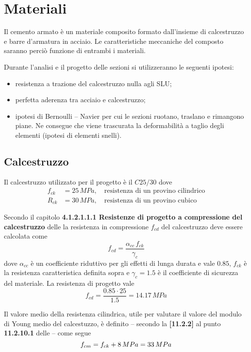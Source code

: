 \chapter{Materiali}\label{chap:materiali}
Il cemento armato \`e un materiale composito formato dall'insieme di calcestruzzo e barre d'armatura in acciaio. Le caratteristiche meccaniche del composto saranno perci\`o funzione di entrambi i materiali.

Durante l'analisi e il progetto delle sezioni si utilizzeranno le seguenti ipotesi:
\begin{itemize}
    \item resistenza a trazione del calcestruzzo nulla agli SLU;
    \item perfetta aderenza tra acciaio e calcestruzzo;
    \item ipotesi di Bernoulli -- Navier per cui le sezioni ruotano, traslano e rimangono piane. Ne consegue che viene trascurata la deformabilit\`a a taglio degli elementi (ipotesi di elementi snelli).
\end{itemize}


\section{Calcestruzzo}
Il calcestruzzo utilizzato per il progetto \`e il $C25/30$ dove 
\begin{align}
	f_{ck} &= 25\,MPa, \label{eq:fck}\quad \text{resistenza di un provino cilindrico}\\
	R_{ck} &= 30\,MPa, \quad \text{resistenza di un provino cubico}
\end{align}

Secondo il capitolo \textbf{4.1.2.1.1.1 Resistenze di progetto a compressione del calcestruzzo} delle \ntc la resistenza in compressione $f_{cd}$ del calcestruzzo deve essere calcolata come
\[ 
f_{cd} = \dfrac{\alpha_{cc}\,f_{ck}}{\gamma_c}
\]
dove $\alpha_{cc}$ \`e un coefficiente riduttivo per gli effetti di lunga durata e vale $0.85$, $f_{ck}$ \`e la resistenza caratteristica definita sopra e $\gamma_c = 1.5$ \`e il coefficiente di sicurezza del materiale. La resistenza di progetto vale
\begin{equation}
	f_{cd} = \dfrac{0.85\cdot 25}{1.5} = 14.17\,MPa\label{eq:fcd}
\end{equation}

Il valore medio della resistenza cilindrica, utile per valutare il valore del modulo di Young medio del calcestuzzo, \`e definito -- secondo la \textbf{[11.2.2]} al punto \textbf{11.2.10.1} delle \ntc -- come segue
\[
f_{cm} = f_{ck} + 8\,MPa = 33\,MPa\\
\]

